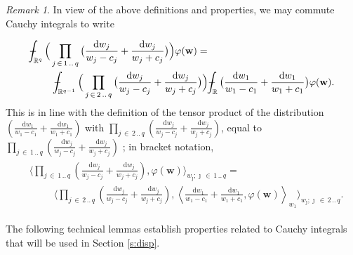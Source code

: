\documentclass[11pt,A4,twoside]{article}
\numberwithin{equation}{section}
\newcommand{\g}[1]{{\color{teal}#1}}
\newcommand{\intcc}{\dashint}
\renewcommand*\d{\mathop{}\!\mathrm{d}}
\newcommand{\w}{\mathbf{w}}
\newcommand{\R}{\mathbbm{R}}
\def\Phint#1{\mathchoice
  {\XXint\displaystyle\textstyle{#1}}%
  {\XXint\textstyle\scriptstyle{#1}}%
  {\XXint\scriptstyle\scriptscriptstyle{#1}}%
  {\XXint\scriptscriptstyle\scriptscriptstyle{#1}}%
  \!\int}
\def\XXint#1#2#3{{\setbox0=\hbox{$#1{#2#3}{\int}$}
    \vcenter{\hbox{$#2#3$}}\kern-.5\wd0}}
\def\dashint{\Phint-}
\def\qqq{\;\;\;\;\;\;\;\;\;}
\def\bel{\begin{eqnarray*}\begin{aligned}}
\def\eel{\end{aligned}\end{eqnarray*}}
\newcommand{\beqa}{\begin{eqnarray}}
\newcommand{\eeqa}{\end{eqnarray}}
\def\bal{\begin{aligned}}
\def\eal{\end{aligned}}
\def\bll#1{
\beqa\label{#1}\bal
}\def\lel{\eal\eeqa}
\newcommand{\beql}[1]{\bll{#1}}
\newcommand{\eeql}{\lel}
\theoremstyle{definition}
\theoremstyle{remark}
\newtheorem{remark}{Remark}[section]
\def\sp{,\;}
\def\R{\mathbb{R}}
\def\bigotimes{\prod}
\begin{document}
\begin{remark}
In view of the above definitions and properties, we may commute Cauchy integrals to write
\beql{e:aggregpvintc}
&\intcc_{\R^{q}}\Big(\bigotimes_{j\, \in\,  1\,..\,q}   \big(\frac{\d w_{j}}{ w_{j}- c_{j} } + \frac{\d w_{j}}{ w_{j} +c_{j} }\big)\Big) \varphi ( \w) =\\
&\qqq \intcc_{\R^{q-1}} \Big( \bigotimes_{j\, \in\, 2 \,..\,q } \big(\frac{\d w_{j}}{w_{j} - c_{j}} + \frac{\d w_{j}}{w_{j} + c_{j}}\big)\Big)   \intcc_\R  \big(\frac{\d w_{1}}{w_{1}-c_1} + \frac{\d w_{1}}{ w_{1}+ c_1} \big) \varphi ( \w).
\\
\eeql
This is in line with the definition of the tensor product of the distribution $(\frac{\d w_{1}}{w_{1}-c_1} + \frac{\d w_{1}}{ w_{1}+c_1} )$ with $\bigotimes_{j\, \in\, 2 \,..\,q } \left(\frac{\d w_{j}}{w_{j} - c_{j}} + \frac{\d w_{j}}{w_{j} + c_{j}}\right)$, equal to $\bigotimes_{j\, \in\,  1\,..\,q}  \left(\frac{\d w_{j}}{w_{j} - c_{j}} + \frac{\d w_{j}}{w_{j} + c_{j}}\right)$ \citep[page 185]{kanwal}; in bracket notation,
{\def\imath{\jmath}
\bel
 &\Bigg\langle\bigotimes_{j\, \in\,  1\,..\,q}  \left(\frac{\d w_{j}}{w_{j} - c_{j}} + \frac{\d w_{j}}{w_{j} + c_{j}}\right), \varphi ( \w) \Bigg\rangle_{w_{\imath}; \imath \,\in\, 1\,..\, q}=\\
&\qqq \Bigg \langle   \bigotimes_{j\, \in\, 2 \,..\,q } \left(\frac{\d w_{j}}{w_{j} - c_{j}} + \frac{\d w_{j}}{w_{j} + c_{j}}\right), \left\langle  \frac{\d w_{1}}{w_{1}-c_1} + \frac{\d w_{1}}{ w_{1}+c_1} 
,  \varphi ( \w) \right\rangle_{w_{1}}\Bigg\rangle_{w_{\imath}; \imath \,\in\, 2\,..\, q}.
\eel}%
\end{remark}

The following technical lemmas establish properties related to Cauchy integrals that will be used in Section \ref{s:disp}.
\end{document}

